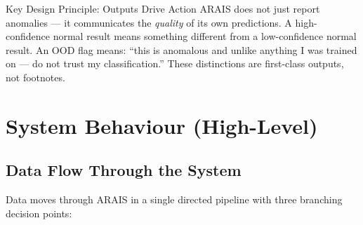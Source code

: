 \documentclass[11pt, a4paper]{article}
\begin{document}
\vspace{6pt}
\begin{amberbox}{Key Design Principle: Outputs Drive Action}
ARAIS does not just report anomalies — it communicates the \textit{quality} of its own 
predictions. A high-confidence normal result means something different from a 
low-confidence normal result. An OOD flag means: ``this is anomalous and unlike
anything I was trained on — do not trust my classification.''
These distinctions are first-class outputs, not footnotes.
\end{amberbox}

\section{System Behaviour (High-Level)}

\subsection{Data Flow Through the System}

Data moves through ARAIS in a single directed pipeline with three branching decision points:
\end{document}
